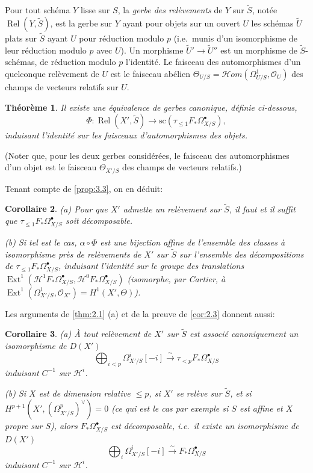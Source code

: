 \documentclass[12pt,a4paper]{article}
\theoremstyle{plain}
\newtheorem{theorem}{Th\'eor\`eme}[section]
\newtheorem{corollary}[theorem]{Corollaire}
\theoremstyle{definition}
\theoremstyle{remark}
\DeclareMathOperator{\Ext}{Ext}
\DeclareMathOperator{\Rel}{Rel}
\newcommand{\cO}{\mathcal{O}}
\begin{document}
Pour tout sch\'ema $Y$ lisse sur $S$, la \emph{gerbe des rel\`evements} de $Y$ sur $\tilde{S}$, not\'ee $\Rel(Y, \tilde{S})$, est la gerbe sur $Y$ ayant pour objets sur un ouvert $U$ les sch\'emas $\tilde{U}$ plats sur $\tilde{S}$ ayant $U$ pour r\'eduction modulo $p$ (i.e.~munis d'un isomorphisme de leur r\'eduction modulo $p$ avec $U$). Un morphisme $\tilde{U}' \to \tilde{U}''$ est un morphisme de $\tilde{S}$-sch\'emas, de r\'eduction modulo $p$ l'identit\'e. Le faisceau des automorphismes d'un quelconque rel\`evement de $U$ est le faisceau ab\'elien $\Theta_{U/S} = \mathscr{H}om(\Omega^1_{U/S}, \cO_U)$ des champs de vecteurs relatifs sur $U$.

\begin{theorem}\label{thm:3.5}
Il existe une \'equivalence de gerbes canonique, d\'efinie ci-dessous,
\[
\Phi: \Rel(X', \tilde{S}) \to \mathrm{sc}(\tau_{\le 1} F_* \Omega^{\bullet}_{X/S}),
\]
induisant l'identit\'e sur les faisceaux d'automorphismes des objets.
\end{theorem}

(Noter que, pour les deux gerbes consid\'er\'ees, le faisceau des automorphismes d'un objet est le faisceau $\Theta_{X'/S}$ des champs de vecteurs relatifs.)

Tenant compte de \ref{prop:3.3}, on en d\'eduit:

\begin{corollary}\label{cor:3.6}
\textup{(a)} Pour que $X'$ admette un rel\`evement sur $\tilde{S}$, il faut et il suffit que $\tau_{\le 1} F_* \Omega^{\bullet}_{X/S}$ soit d\'ecomposable.

\textup{(b)} Si tel est le cas, $\alpha \circ \Phi$ est une bijection affine de l'ensemble des classes \`a isomorphisme pr\`es de rel\`evements de $X'$ sur $\tilde{S}$ sur l'ensemble des d\'ecompositions de $\tau_{\le 1} F_* \Omega^{\bullet}_{X/S}$, induisant l'identit\'e sur le groupe des translations $\Ext^1(\mathscr{H}^1 F_* \Omega^{\bullet}_{X/S}, \mathscr{H}^0 F_* \Omega^{\bullet}_{X/S})$ (isomorphe, par Cartier, \`a $\Ext^1(\Omega^1_{X'/S}, \cO_{X'}) = H^1(X', \Theta)$).
\end{corollary}

Les arguments de \ref{thm:2.1} (a) et de la preuve de \ref{cor:2.3} donnent aussi:

\begin{corollary}\label{cor:3.7}
\textup{(a)} \`A tout rel\`evement de $X'$ sur $\tilde{S}$ est associ\'e canoniquement un isomorphisme de $D(X')$
\[
\bigoplus_{i < p} \Omega^i_{X'/S}[-i] \xrightarrow{\sim} \tau_{<p} F_* \Omega^{\bullet}_{X/S}
\]
induisant $C^{-1}$ sur $\mathscr{H}^i$.

\textup{(b)} Si $X$ est de dimension relative $\le p$, si $X'$ se rel\`eve sur $\tilde{S}$, et si $H^{p+1}(X', (\Omega^p_{X'/S})^\vee) = 0$ (ce qui est le cas par exemple si $S$ est affine et $X$ propre sur $S$), alors $F_* \Omega^{\bullet}_{X/S}$ est d\'ecomposable, i.e.~il existe un isomorphisme de $D(X')$
\[
\bigoplus_i \Omega^i_{X'/S}[-i] \xrightarrow{\sim} F_* \Omega^{\bullet}_{X/S}
\]
induisant $C^{-1}$ sur $\mathscr{H}^i$.
\end{corollary}
\end{document}
